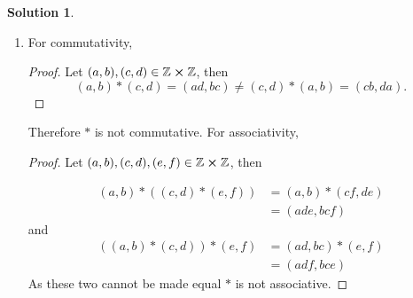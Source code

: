 \documentclass[10pt]{article}
\theoremstyle{definition}
\newtheorem{soln}{Solution}
\newcommand{\justif}[2]{&{#1}&\text{#2}}
\begin{document}
\begin{soln}
\begin{enumerate}[label=(\alph*)]
\begin{proof}
\begin{align*}
            \end{align*}
            and
            \begin{align*}
              ((a,b)*(c,d))*(e,f) & = (ad+bc, bd)*(e,f)                                                            \\
                                  & =  ((ad+bc)f+bde, bdf)                                                         \\
                                  & =  (fad+fbc+bde, bdf)\justif{\quad}{\cdot distributive on $\mathbb{Z}$}        \\
                                  & =  (adf+bcf+bde, bdf)\justif{\quad}{\cdot commutative on $\mathbb{Z}$}
            \end{align*}
            As these two are equal, $*$ is associative. \qedhere
          \end{proof}
    \item For commutativity,
          \begin{proof}
            Let $(a,b),(c,d)\in\mathbb{Z}\cross\mathbb{Z}$, then
            $$
              (a,b)*(c,d)=(ad,bc)\neq (c,d)*(a,b) =(cb,da).
            $$
          \end{proof}
          Therefore $*$ is not commutative. \qedhere
          For associativity,
          \begin{proof}
            Let $(a,b),(c,d),(e,f)\in\mathbb{Z}\cross\mathbb{Z}$, then

            \begin{align*}
              (a,b)*((c,d)*(e,f)) & = (a,b)*(cf,de) \\
                                  & = (ade,bcf)
            \end{align*}
            and
            \begin{align*}
              ((a,b)*(c,d))*(e,f) & = (ad,bc)*(e,f) \\
                                  & = (adf,bce)
            \end{align*}
            As these two cannot be made equal $*$ is not associative. \qedhere
          \end{proof}
  \end{enumerate}
\end{soln}
\newpage
\end{document}

